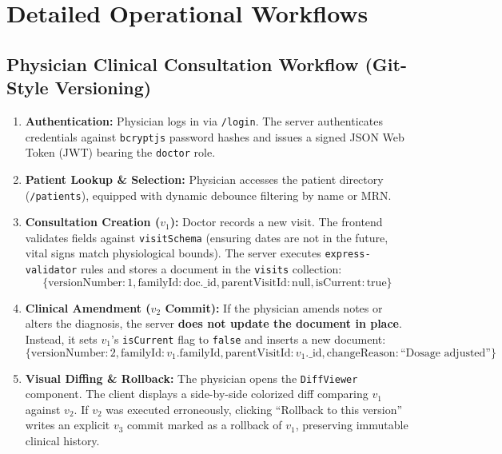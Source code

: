 \documentclass[12pt,a4paper,oneside]{report}
\begin{document}
\section{Detailed Operational Workflows}

\subsection{Physician Clinical Consultation Workflow (Git-Style Versioning)}
\begin{enumerate}
    \item \textbf{Authentication:} Physician logs in via \texttt{/login}. The server authenticates credentials against \texttt{bcryptjs} password hashes and issues a signed JSON Web Token (JWT) bearing the \texttt{doctor} role.
    \item \textbf{Patient Lookup \& Selection:} Physician accesses the patient directory (\texttt{/patients}), equipped with dynamic debounce filtering by name or MRN.
    \item \textbf{Consultation Creation ($v_1$):} Doctor records a new visit. The frontend validates fields against \texttt{visitSchema} (ensuring dates are not in the future, vital signs match physiological bounds). The server executes \texttt{express-validator} rules and stores a document in the \texttt{visits} collection:
    $$\{ \text{versionNumber}: 1, \text{familyId}: \text{doc.\_id}, \text{parentVisitId}: \text{null}, \text{isCurrent}: \text{true} \}$$
    \item \textbf{Clinical Amendment ($v_2$ Commit):} If the physician amends notes or alters the diagnosis, the server \textbf{does not update the document in place}. Instead, it sets $v_1$'s \texttt{isCurrent} flag to \texttt{false} and inserts a new document:
    $$\{ \text{versionNumber}: 2, \text{familyId}: v_1.\text{familyId}, \text{parentVisitId}: v_1.\text{\_id}, \text{changeReason}: \text{``Dosage adjusted''} \}$$
    \item \textbf{Visual Diffing \& Rollback:} The physician opens the \texttt{DiffViewer} component. The client displays a side-by-side colorized diff comparing $v_1$ against $v_2$. If $v_2$ was executed erroneously, clicking ``Rollback to this version'' writes an explicit $v_3$ commit marked as a rollback of $v_1$, preserving immutable clinical history.
\end{enumerate}
\end{document}
